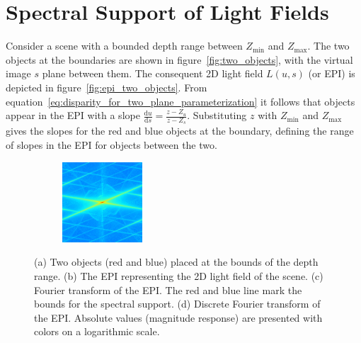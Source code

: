 \section{Spectral Support of Light Fields}
\label{sec:Spectral_Support_for_Light_Field}

Consider a scene with a bounded depth range between $Z_{\text{min}}$ and $Z_{\text{max}}$.
The two objects at the boundaries are shown in figure~\ref{fig:two_objects}, with the virtual image $s$ plane between them.
The consequent 2D light field $L(u, s)$ (or EPI) is depicted in figure~\ref{fig:epi_two_objects}.
From equation~\ref{eq:disparity_for_two_plane_parameterization} it follows that objects appear in the EPI with a slope $\frac{\textrm{d}u}{\textrm{d}s} = \frac{z - Z_u}{z - Z_s}$.
Substituting $z$ with $Z_\text{min}$ and $Z_\text{max}$ gives the slopes for the red and blue objects at the boundary, defining the range of slopes in the EPI for objects between the two.

\begin{figure}[tb]
	\begin{subfigure}{0.5\textwidth}
		\centering
		
		\caption{}
		\label{fig:two_objects}
		\vspace{0.5cm}
		
		\caption{}
		\label{fig:epi_fourier_transform_1}
	\end{subfigure}
	\begin{subfigure}{0.5\textwidth}
		\centering
		
		\caption{}
		\label{fig:epi_two_objects}
		\vspace{0.5cm}
		\includegraphics[height = 3cm]{../Figures/spectral_support/fft_red_and_blue.png}
		\caption{}
		\label{fig:epi_fourier_transform_2}
	\end{subfigure}
	\caption[Spectral analysis for light fields with bounded depth range]
			{(a) Two objects (red and blue) placed at the bounds of the depth range. 
			 (b) The EPI representing the 2D light field of the scene.
			 (c) Fourier transform of the EPI. 
			 The red and blue line mark the bounds for the spectral support.
			 (d) Discrete Fourier transform of the EPI. 
			 Absolute values (magnitude response) are presented with colors on a logarithmic scale.}
	\label{fig:spectral_analysis_for_light_field}
\end{figure}

